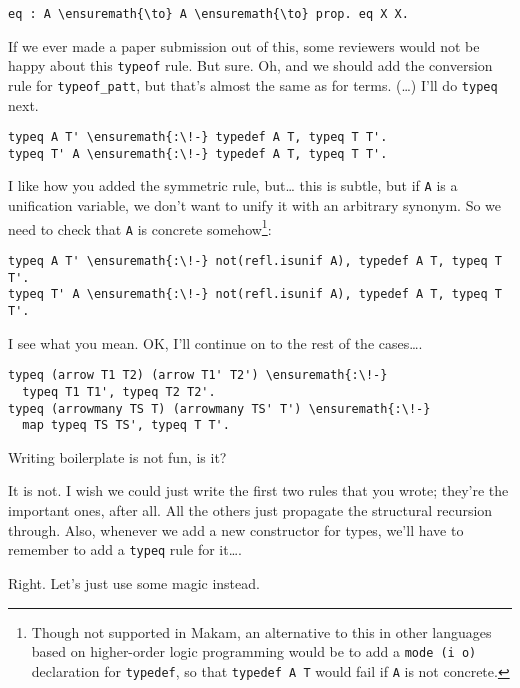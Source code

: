 \begin{verbatim}
eq : A \ensuremath{\to} A \ensuremath{\to} prop. eq X X.
\end{verbatim}

\heroSTUDENT{} If we ever made a paper submission out of this, some reviewers
would not be happy about this \texttt{typeof} rule. But sure. Oh, and we
should add the conversion rule for \texttt{typeof\_patt}, but that's
almost the same as for terms. (\ldots{}) I'll do \texttt{typeq} next.

\begin{verbatim}
typeq A T' \ensuremath{:\!-} typedef A T, typeq T T'.
typeq T' A \ensuremath{:\!-} typedef A T, typeq T T'.
\end{verbatim}

\heroADVISOR{} I like how you added the symmetric rule, but\ldots{} this is
subtle, but if \texttt{A} is a unification variable, we don't want to
unify it with an arbitrary synonym. So we need to check that \texttt{A}
is concrete
somehow\footnote{Though not supported in Makam, an alternative to this in other languages based on higher-order logic programming would be to add a \texttt{mode (i o)} declaration for \texttt{typedef}, so that \texttt{typedef A T} would fail if \texttt{A} is not concrete.}:

\begin{verbatim}
typeq A T' \ensuremath{:\!-} not(refl.isunif A), typedef A T, typeq T T'.
typeq T' A \ensuremath{:\!-} not(refl.isunif A), typedef A T, typeq T T'.
\end{verbatim}

\heroSTUDENT{} I see what you mean. OK, I'll continue on to the rest of the
cases\ldots{}.

\begin{verbatim}
typeq (arrow T1 T2) (arrow T1' T2') \ensuremath{:\!-}
  typeq T1 T1', typeq T2 T2'.
typeq (arrowmany TS T) (arrowmany TS' T') \ensuremath{:\!-}
  map typeq TS TS', typeq T T'.
\end{verbatim}

\heroADVISOR{} Writing boilerplate is not fun, is it?

\heroSTUDENT{} It is not. I wish we could just write the first two rules that
you wrote; they're the important ones, after all. All the others just
propagate the structural recursion through. Also, whenever we add a new
constructor for types, we'll have to remember to add a \texttt{typeq}
rule for it\ldots{}.

\heroADVISOR{} Right. Let's just use some magic instead.

